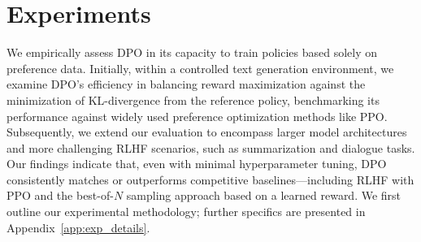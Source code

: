 \section{Experiments}
We empirically assess DPO in its capacity to train policies based solely on preference data. Initially, within a controlled text generation environment, we examine DPO's efficiency in balancing reward maximization against the minimization of KL-divergence from the reference policy, benchmarking its performance against widely used preference optimization methods like PPO. Subsequently, we extend our evaluation to encompass larger model architectures and more challenging RLHF scenarios, such as summarization and dialogue tasks. Our findings indicate that, even with minimal hyperparameter tuning, DPO consistently matches or outperforms competitive baselines—including RLHF with PPO and the best-of-$N$ sampling approach based on a learned reward. We first outline our experimental methodology; further specifics are presented in Appendix~\ref{app:exp_details}.

